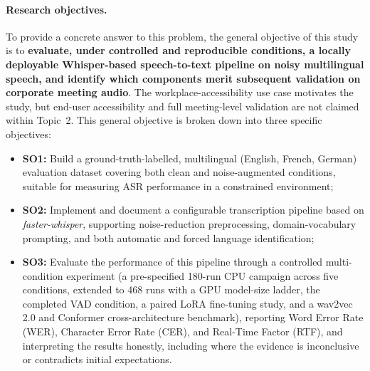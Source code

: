 \documentclass[12pt]{report}
\begin{document}
\paragraph{Research objectives.}
To provide a concrete answer to this problem, the general objective of this study is to \textbf{evaluate, under controlled and reproducible conditions, a locally deployable Whisper-based speech-to-text pipeline on noisy multilingual speech, and identify which components merit subsequent validation on corporate meeting audio}. The workplace-accessibility use case motivates the study, but end-user accessibility and full meeting-level validation are not claimed within Topic~2. This general objective is broken down into three specific objectives:
\begin{itemize}
    \item \textbf{SO1:} Build a ground-truth-labelled, multilingual (English, French, German) evaluation dataset covering both clean and noise-augmented conditions, suitable for measuring ASR performance in a constrained environment;
    \item \textbf{SO2:} Implement and document a configurable transcription pipeline based on \textit{faster-whisper}, supporting noise-reduction preprocessing, domain-vocabulary prompting, and both automatic and forced language identification;
    \item \textbf{SO3:} Evaluate the performance of this pipeline through a controlled multi-condition experiment (a pre-specified 180-run CPU campaign across five conditions, extended to 468 runs with a GPU model-size ladder, the completed VAD condition, a paired LoRA fine-tuning study, and a wav2vec 2.0 and Conformer cross-architecture benchmark), reporting Word Error Rate (WER), Character Error Rate (CER), and Real-Time Factor (RTF), and interpreting the results honestly, including where the evidence is inconclusive or contradicts initial expectations.
\end{itemize}
\end{document}
